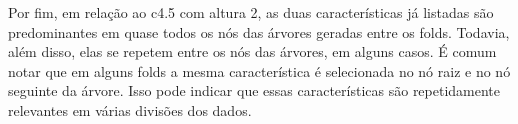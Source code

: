 \documentclass[template.tex]{subfiles}
\begin{document}
%
%
%



Por fim, em relação ao c4.5 com altura 2, as duas características já listadas são predominantes em quase todos os nós das árvores geradas entre os folds. Todavia, além disso, elas se repetem entre os nós das árvores, em alguns casos. É comum notar que em alguns folds a mesma característica é selecionada no nó raiz e no nó seguinte da árvore. Isso pode indicar que essas características são repetidamente relevantes em várias divisões dos dados. 

%
%
%
\end{document}
